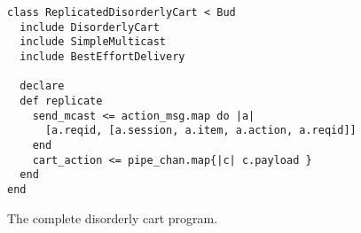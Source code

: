 \begin{figure}[h]
\begin{scriptsize}
\begin{lstlisting}
class ReplicatedDisorderlyCart < Bud
  include DisorderlyCart
  include SimpleMulticast
  include BestEffortDelivery

  declare
  def replicate
    send_mcast <= action_msg.map do |a| 
      [a.reqid, [a.session, a.item, a.action, a.reqid]] 
    end
    cart_action <= pipe_chan.map{|c| c.payload }
  end
end
\end{lstlisting}
\centering
\vspace{-10pt}
\caption{The complete disorderly cart program.}
\label{fig:complete-dis-cart}
\end{scriptsize}
\vspace{-2pt}
\end{figure}